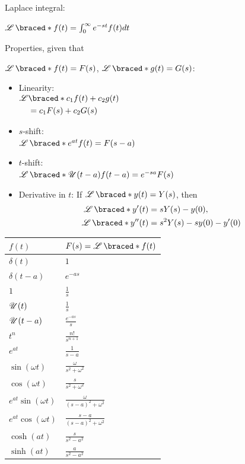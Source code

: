 
Laplace integral:

$\laplace\braced*{f(t)} = \int_0^{\infty} e^{-st}
f(t)dt $

Properties, given that

$\laplace\braced*{f(t)} = F(s)$, $\laplace\braced*{g(t)} = G(s)$:

\begin{itemize}
\item Linearity: \\$
  \begin{aligned}
\laplace&\braced*{c_1f(t)+c_2g(t)} \\&= c_1F(s) + c_2G(s)
\end{aligned}
$
\item \(s\)-shift:  \\ $\laplace\braced*{e^{at}f(t)} = F(s-a)$
\item \(t\)-shift: \\ $\laplace\braced*{\hstep(t-a)f(t-a)} = e^{-sa}F(s)$

\item Derivative in \(t\): If $\laplace\braced*{y(t)} = Y(s)$, then
  \begin{align*}
    \laplace\braced*{y'(t)} &= sY(s)-y(0), \\
    \laplace\braced*{y''(t)} &= s^2Y(s) - sy(0) - y'(0)
  \end{align*}

\end{itemize}

  \begin{center}
\renewcommand{\arraystretch}{2}
\begin{tabular}{ |>{\centering\arraybackslash}m{0.5in}|>{\centering\arraybackslash}m{0.8in}|}
  $f(t)$ & $F(s) = \laplace\braced*{f(t)}$\\\hline
$\delta(t)$ & $1$ \\
$\delta(t-a)$ & $e^{-as}$ \\
$1$ & $\frac{1}{s}$ \\
$\operatorname{\mathscr{U}}(t)$ & $\frac{1}{s}$ \\
$\operatorname{\mathscr{U}}(t-a)$ & $\frac{e^{-as}}{s}$ \\
$t^n$ & $\frac{n!}{s^{n+1}}$ \\
$e^{at}$ & $\frac{1}{s-a}$ \\
$\sin(\omega t)$ & $\frac{\omega}{s^2+\omega^2}$ \\
$\cos(\omega t)$ & $\frac{s}{s^2+\omega^2}$ \\
$e^{at}\sin(\omega t)$ & $\frac{\omega}{(s-a)^2+\omega^2}$ \\
$e^{at}\cos(\omega t)$ & $\frac{s-a}{(s-a)^2+\omega^2}$ \\
$\cosh(at)$ & $\frac{s}{s^2-a^2}$ \\
$\sinh(at)$ & $\frac{a}{s^2-a^2}$ \\
\end{tabular}
\end{center}
